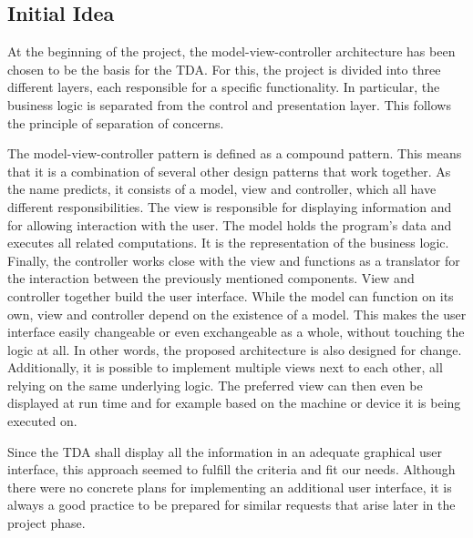 \iffalse
\emph{Describe both the architecture and the design of your 
software. Illustrate its architecture and design using appropriate UML diagrams. 
Motivate its architecture and design in the light of design principles and 
possible alternatives. Also highlight any use of architectural 
patterns and design patterns. Pay special attention to justifying all design 
decisions taken.}
\fi

\subsection{Initial Idea}
At the beginning of the project, the model-view-controller architecture has been chosen to be the basis for the TDA. For this, the project is divided into three different layers, each responsible for a specific functionality. In particular, the business logic is separated from the control and presentation layer. This follows the principle of separation of concerns.

The model-view-controller pattern is defined as a compound pattern. This means that it is a combination of several other design patterns that work together. As the name predicts, it consists of a model, view and controller, which all have different responsibilities. The view is responsible for displaying information and for allowing interaction with the user. The model holds the program's data and executes all related computations. It is the representation of the business logic. Finally, the controller works close with the view and functions as a translator for the interaction between the previously mentioned components. View and controller together build the user interface.
While the model can function on its own, view and controller depend on the existence of a model. This makes the user interface easily changeable or even exchangeable as a whole, without touching the logic at all. In other words, the proposed architecture is also designed for change. Additionally, it is possible to implement multiple views next to each other, all relying on the same underlying logic. The preferred view can then even be displayed at run time and for example based on the machine or device it is being executed on.

Since the TDA shall display all the information in an adequate graphical user interface, this approach seemed to fulfill the criteria and fit our needs. Although there were no concrete plans for implementing an additional user interface, it is always a good practice to be prepared for similar requests that arise later in the project phase.

